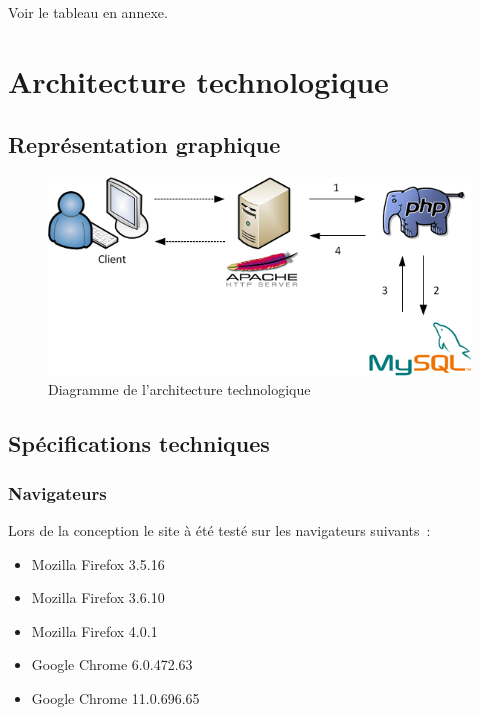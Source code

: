 \documentclass[letter, 11pt]{report}
\begin{document}
Voir le tableau en annexe.

\chapter{Architecture technologique}

\section{Représentation graphique}

\begin{figure}[htbp]
	\begin{center}
		\includegraphics[scale=0.75]{architectureTechnologique.png}
	\end{center}
	\caption{Diagramme de l'architecture technologique}
\end{figure}

\section{Spécifications techniques}


\subsection{Navigateurs}
Lors de la conception le site à été testé sur les navigateurs suivants~:

\begin{itemize}
	\item Mozilla Firefox 3.5.16
	\item Mozilla Firefox 3.6.10
	\item Mozilla Firefox 4.0.1
	\item Google Chrome 6.0.472.63
	\item Google Chrome 11.0.696.65
\end{itemize}
\end{document}
